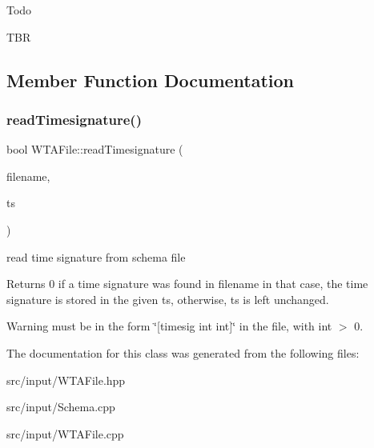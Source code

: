 \begin{DoxyRefDesc}{Todo}
\item[\mbox{\hyperlink{todo__todo000009}{Todo}}]T\+BR \end{DoxyRefDesc}


\subsection{Member Function Documentation}
\mbox{\label{classWTAFile_a1ba7fa9966d052ee8c2e7ce1b01666b3}} 
\subsubsection{\texorpdfstring{readTimesignature()}{readTimesignature()}}
{\footnotesize\ttfamily bool W\+T\+A\+File\+::read\+Timesignature (\begin{DoxyParamCaption}\item[{const std\+::string}]{filename,  }\item[{\mbox{\hyperlink{classScoreModel_1_1ScoreMeter}{Score\+Model\+::\+Score\+Meter}} \&}]{ts }\end{DoxyParamCaption})\hspace{0.3cm}{\ttfamily [static]}}



read time signature from schema file 

\begin{DoxyReturn}{Returns}
0 if a time signature was found in filename in that case, the time signature is stored in the given ts, otherwise, ts is left unchanged.
\end{DoxyReturn}
\begin{DoxyWarning}{Warning}
must be in the form \char`\"{}\mbox{[}timesig int int\mbox{]}\char`\"{} in the file, with int $>$ 0. 
\end{DoxyWarning}


The documentation for this class was generated from the following files\+:\begin{DoxyCompactItemize}
\item 
src/input/W\+T\+A\+File.\+hpp\item 
src/input/Schema.\+cpp\item 
src/input/W\+T\+A\+File.\+cpp\end{DoxyCompactItemize}
